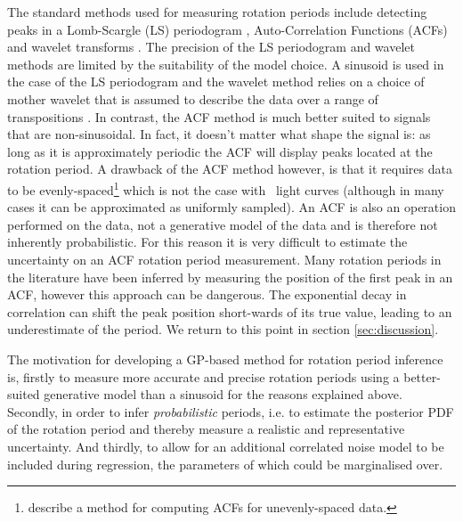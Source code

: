 The standard methods used for measuring rotation periods include detecting
peaks in a Lomb-Scargle \citep{Lomb1976, Scargle1982} (LS) periodogram
\citep[e.g.][]{Reinhold2013}, Auto-Correlation Functions (ACFs)
\citep{Mcquillan2013} and wavelet transforms \citep{Garcia2014}.
The precision of the LS periodogram and wavelet methods are limited by the
suitability of the model choice.
A sinusoid is used in the case of the LS periodogram and the wavelet method
relies on a choice of mother wavelet that is assumed to describe the data over
a range of transpositions \citep[see, \eg][]{Carter2010}.
In contrast, the ACF method is much better suited to signals that are
non-sinusoidal.
In fact, it doesn't matter what shape the signal is: as long as it is
approximately periodic the ACF will display peaks located at the rotation
period.
A drawback of the ACF method however, is that it requires data to be
evenly-spaced\footnote{\citet{Edelson1988} describe a method for computing
ACFs for unevenly-spaced data.} which is not the case with \Kepler\ light
curves (although in many cases it can be approximated as uniformly sampled).
An ACF is also an operation performed on the data, not a generative model of
the data and is therefore not inherently probabilistic.
For this reason it is very difficult to estimate the uncertainty on an ACF
rotation period measurement.
Many rotation periods in the literature have been inferred by measuring the
position of the first peak in an ACF, however this approach can be dangerous.
The exponential decay in correlation can shift the peak position short-wards
of its true value, leading to an underestimate of the period.
We return to this point in section \textsection \ref{sec:discussion}.

The motivation for developing a GP-based method for rotation period inference
is, firstly to measure more accurate and precise rotation periods using a
better-suited generative model than a sinusoid for the reasons explained
above.
Secondly, in order to infer {\it probabilistic} periods, i.e. to estimate the
posterior PDF of the rotation period and thereby measure a realistic and
representative uncertainty.
And thirdly, to allow for an additional correlated noise model to be included
during regression, the parameters of which could be marginalised over.

